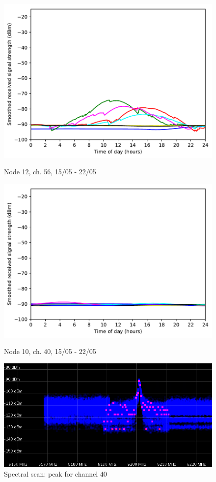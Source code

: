 \documentclass[a4paper, 11pt]{article}
\begin{document}
\begin{figure}[!ht]
\begin{minipage}{0.47\textwidth}
	\includegraphics[width=\textwidth]{images/5_GHz/cot-node12-student_2017-05-21_chan56_image.pdf}
	\caption{Node 12, ch. 56, 15/05 - 22/05}
	\label{node12_ch56_usage}
\end{minipage}\hfill
\begin{minipage}{0.47\textwidth}
	\centering
	\includegraphics[width=\textwidth]{images/5_GHz/cot-node10-student_2017-05-22_chan40_image.pdf}
	\caption{Node 10, ch. 40, 15/05 - 22/05}
	\label{node10_ch40_usage}
\end{minipage}\hfill

	\centering
	\includegraphics[width=\textwidth]{ch40_peak.png}
	\caption{Spectral scan: peak for channel 40}
	\label{ch40_peak}


\end{figure}\\
\end{document}
